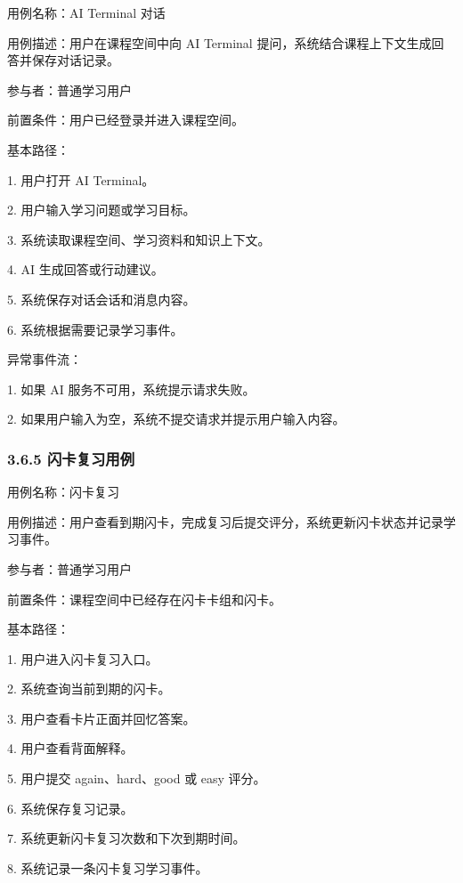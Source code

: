 \documentclass[10pt,a4paper,fontset=none]{ctexart}
\begin{document}
用例名称：AI Terminal 对话\par

用例描述：用户在课程空间中向 AI Terminal 提问，系统结合课程上下文生成回答并保存对话记录。\par

参与者：普通学习用户\par

前置条件：用户已经登录并进入课程空间。\par

基本路径：\par

1. 用户打开 AI Terminal。\par
2. 用户输入学习问题或学习目标。\par
3. 系统读取课程空间、学习资料和知识上下文。\par
4. AI 生成回答或行动建议。\par
5. 系统保存对话会话和消息内容。\par
6. 系统根据需要记录学习事件。\par

异常事件流：\par

1. 如果 AI 服务不可用，系统提示请求失败。\par
2. 如果用户输入为空，系统不提交请求并提示用户输入内容。\par

\subsubsection*{3.6.5 闪卡复习用例}

用例名称：闪卡复习\par

用例描述：用户查看到期闪卡，完成复习后提交评分，系统更新闪卡状态并记录学习事件。\par

参与者：普通学习用户\par

前置条件：课程空间中已经存在闪卡卡组和闪卡。\par

基本路径：\par

1. 用户进入闪卡复习入口。\par
2. 系统查询当前到期的闪卡。\par
3. 用户查看卡片正面并回忆答案。\par
4. 用户查看背面解释。\par
5. 用户提交 again、hard、good 或 easy 评分。\par
6. 系统保存复习记录。\par
7. 系统更新闪卡复习次数和下次到期时间。\par
8. 系统记录一条闪卡复习学习事件。\par
\end{document}
